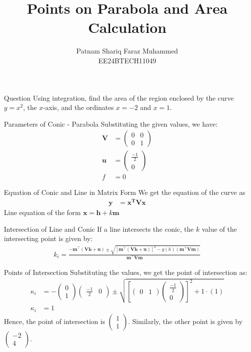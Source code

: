 \documentclass{beamer}
\title{Points on Parabola and Area Calculation}
\author{Patnam Shariq Faraz Muhammed \\ EE24BTECH11049}
\date{}
\providecommand{\sbrak}[1]{\ensuremath{{}\left[#1\right]}}
\providecommand{\brak}[1]{\ensuremath{\left(#1\right)}}
\theoremstyle{remark}
\newcommand{\myvec}[1]{\ensuremath{\begin{pmatrix}#1\end{pmatrix}}}
\let\vec\mathbf
\numberwithin{equation}{section}
\begin{document}
\begin{frame}
\titlepage
\end{frame}

\begin{frame}{Question}
  Using integration, find the area of the region enclosed by the curve \(y = x^2\), the \(x\)-axis, and the ordinates \(x = -2\) and \(x = 1\).
\end{frame}

\begin{frame}
\begin{table}[H]    
      \centering 
\end{table}
\end{frame}

\begin{frame}{Parameters of Conic - Parabola}
Substituting the given values, we have:
\begin{align}
  \vec{V} &= \myvec{ 0 & 0 \\ 0 & 1 } \\
  \vec{u} &= \myvec{ \frac{-1}{2} \\ 0 } \\
  f &= 0
\end{align}
\end{frame}

\begin{frame}{Equation of Conic and Line in Matrix Form}
  We get the equation of the curve as
  \begin{align}
    \vec{y} &= \vec{x^T V x}
  \end{align}
  Line equation of the form \( \vec{x} = \vec{h} + k \vec{m} \)
\end{frame}

\begin{frame}{Intersection of Line and Conic}
If a line intersects the conic, the \(k\) value of the intersecting point is given by:
\begin{align}
  k_i = \frac{-\vec{m}^{\top}\brak{\vec{Vh} + \vec{u}} \pm \sqrt{\sbrak{\vec{m}^{\top}\brak{\vec{Vh} + \vec{u}}}^2 - g(h)\brak{\vec{m}^{\top} \vec{Vm}}}}{\vec{m}^{\top} \vec{Vm}}
\end{align}
\end{frame}

\begin{frame}{Points of Intersection}
Substituting the values, we get the point of intersection as:
\begin{align}
  \kappa_i &= -\myvec{0 \\ 1} \myvec{\frac{-1}{2} & 0} \pm \sqrt{\sbrak{\myvec{0 & 1} \myvec{ \frac{-1}{2} \\ 0} }^2 + 1 \cdot \brak{1}} \\
  \kappa_i &= 1
\end{align}
Hence, the point of intersection is \(\myvec{ 1 \\ 1}\). Similarly, the other point is given by \(\myvec{ -2 \\ 4}\).
\end{frame}
\end{document}
